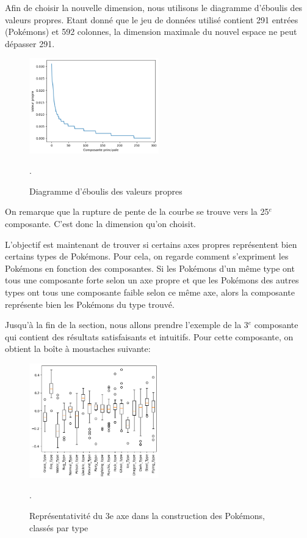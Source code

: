 \documentclass[a4paper,12pt]{article}
\begin{document}
Afin de choisir la nouvelle dimension, nous utilisons le diagramme d'éboulis des
valeurs propres. Etant donné que le jeu de données utilisé contient 291 entrées
(Pokémons) et 592 colonnes, la dimension maximale du nouvel espace ne peut
dépasser 291. 
\newpage
\begin{figure}[!h]
    \centering
    \includegraphics[width=0.5\textwidth]{eboulis_MCA.png}
    \caption{Diagramme d'éboulis des valeurs propres}.
\end{figure}

On remarque que la rupture de pente de la courbe se trouve vers la 25$^{e}$
composante. C'est donc la dimension qu'on choisit.

L'objectif est maintenant de trouver si certains axes propres représentent bien
certains types de Pokémons. Pour cela, on regarde comment s'expriment les
Pokémons en fonction des composantes. Si les Pokémons d'un même type ont tous
une composante forte selon un axe propre et que les Pokémons des autres types
ont tous une composante faible selon ce même axe, alors la composante représente
bien les Pokémons du type trouvé. 

Jusqu'à la fin de la section, nous allons prendre l'exemple de la 3$^{e}$
composante qui contient des résultats satisfaisants et intuitifs. Pour cette
composante, on obtient la boîte à moustaches suivante: 
\begin{figure}[!h]
    \centering
    \includegraphics[width=0.5\textwidth]{moustache_MCA.png}
    \caption{Représentativité du 3e axe dans la construction des Pokémons,
    classés par type}.
\end{figure}
\end{document}
